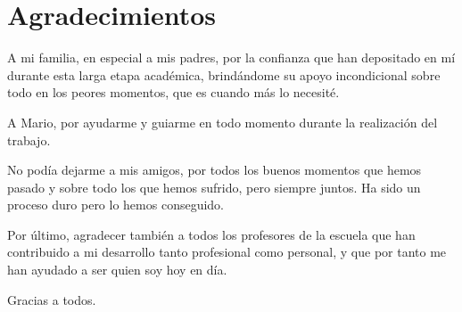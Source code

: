 \blankpage
\newpage
\thispagestyle{plain}
\section*{Agradecimientos}
  
  A mi familia, en especial a mis padres, por la confianza que han depositado en mí durante esta larga etapa académica, brindándome su apoyo incondicional sobre todo en los peores momentos, que es cuando más lo necesité.  

  A Mario, por ayudarme y guiarme en todo momento durante la realización del trabajo.

  No podía dejarme a mis amigos, por todos los buenos momentos que hemos pasado y sobre todo los que hemos sufrido, pero siempre juntos. Ha sido un proceso duro pero lo hemos conseguido.  

  Por último, agradecer también a todos los profesores de la escuela que han contribuido a mi desarrollo tanto profesional como personal, y que por tanto me han ayudado a ser quien soy hoy en día. 

  Gracias a todos.

\afterpage{\blankpage}
